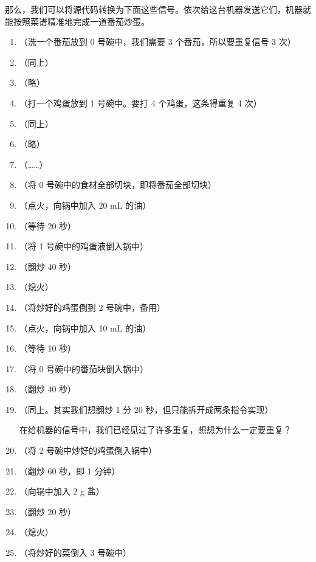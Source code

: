 那么，我们可以将源代码转换为下面这些信号。依次给这台机器发送它们，机器就能按照菜谱精准地完成一道番茄炒蛋。

\begin{enumerate}
  \item {}（洗一个番茄放到 0 号碗中，我们需要 3 个番茄，所以要重复信号 3 次）
  \item {}（同上）
  \item {}（略）
  \item {}（打一个鸡蛋放到 1 号碗中。要打 4 个鸡蛋，这条得重复 4 次）
  \item {}（同上）
  \item {}（略）
  \item {}（……）
  \item {}（将 0 号碗中的食材全部切块，即将番茄全部切块）
  \item {}（点火，向锅中加入 20 mL 的油）
  \item {}（等待 20 秒）
  \item {}（将 1 号碗中的鸡蛋液倒入锅中）
  \item {}（翻炒 40 秒）
  \item {}（熄火）
  \item {}（将炒好的鸡蛋倒到 2 号碗中，备用）
  \item {}（点火，向锅中加入 10 mL 的油）
  \item {}（等待 10 秒）
  \item {}（将 0 号碗中的番茄块倒入锅中）
  \item {}（翻炒 40 秒）
  \item {}（同上。其实我们想翻炒 1 分 20 秒，但只能拆开成两条指令实现）
    \begin{note}
      在给机器的信号中，我们已经见过了许多重复，想想为什么一定要重复？
    \end{note}
  \item {}（将 2 号碗中炒好的鸡蛋倒入锅中）
  \item {}（翻炒 60 秒，即 1 分钟）
  \item {}（向锅中加入 2 g 盐）
  \item {}（翻炒 20 秒）
  \item {}（熄火）
  \item {}（将炒好的菜倒入 3 号碗中）
\end{enumerate}

